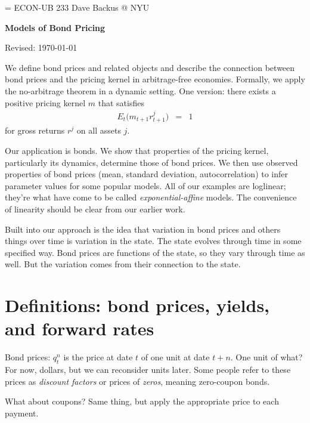 \documentclass[11pt]{article}
\begin{document}
\parskip=\bigskipamount
\parindent=0.0in
\thispagestyle{empty}
{\large ECON-UB 233 \hfill Dave Backus @ NYU}

\bigskip\bigskip
\centerline{\Large \bf Models of Bond Pricing}
\centerline{Revised: \today}

\bigskip
We define bond prices and related objects
and describe the connection between bond prices and the
pricing kernel in arbitrage-free economies.
Formally, we apply the no-arbitrage theorem in a dynamic setting.
One version:  there exists a positive pricing kernel $m$ that satisfies
\begin{eqnarray}
    E_t \big( m_{t+1} r_{t+1}^j \big) &=& 1
    \label{eq:E(mr)=1}
\end{eqnarray}
for gross returns $r^j$ on all assets $j$.

Our application is bonds.
We show that properties of the pricing kernel,
particularly its dynamics,
determine those of bond prices.
We then use observed properties of bond prices
(mean, standard deviation, autocorrelation)
to infer parameter values for some popular models.
All of our examples are loglinear; they're what have come to be
called {\it exponential-affine\/} models.
The convenience of linearity should be clear from our earlier work.

Built into our approach is the idea that variation in
bond prices and others things over time
is variation in the state.
The state evolves through time in some specified way.
Bond prices are functions of the state,
so they vary through time as well.
But the variation comes from their connection to the state.


\section{Definitions:  bond prices, yields, and forward rates}

Bond prices:
$q^n_t$ is the price at date $t$ of one unit
at date $t+n$.
One unit of what?
For now, dollars, but we can reconsider units later.
Some people refer to these prices as {\it discount factors\/}
or prices of {\it zeros\/}, meaning zero-coupon bonds.

What about coupons?  Same thing, but apply the appropriate price
to each payment.
\end{document}
